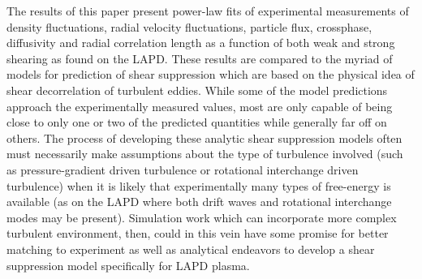 \documentclass[aip,pop,amsmath,amssymb,preprint,superscriptaddress]{revtex4-1} %
\begin{document}
The results of this paper present power-law fits of experimental measurements of density fluctuations, radial velocity fluctuations, particle flux, crossphase, diffusivity and radial correlation length as a function of both weak and strong shearing as found on the LAPD. These results are compared to the myriad of models for prediction of shear suppression which are based on the physical idea of shear decorrelation of turbulent eddies. While some of the model predictions approach the experimentally measured values, most are only capable of being close to only one or two of the predicted quantities while generally far off on others. The process of developing these analytic shear suppression models often must necessarily make assumptions about the type of turbulence involved (such as pressure-gradient driven turbulence or rotational interchange driven turbulence) when it is likely that experimentally many types of free-energy is available (as on the LAPD where both drift waves and rotational interchange modes may be present). Simulation work which can incorporate more complex turbulent environment, then, could in this vein have some promise for better matching to experiment as well as analytical endeavors to develop a shear suppression model specifically for LAPD plasma. 
\end{document}

